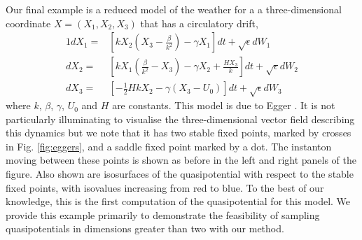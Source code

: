 Our final example is a reduced model of the weather for a a three-dimensional
coordinate $X=(X_{1},X_{2},X_{3})$ that has a circulatory drift,
\begin{alignat}{1}
dX_{1}= & \left[kX_{2}\left(X_{3}-\frac{\beta}{k^{2}}\right)-\gamma X_{1}\right]dt+\sqrt{\epsilon}dW_{1}\nonumber \\
dX_{2}= & \left[kX_{1}\left(\frac{\beta}{k^{2}}-X_{3}\right)-\gamma X_{2}+\frac{HX_{3}}{k}\right]dt+\sqrt{\epsilon}dW_{2}\nonumber \\
dX_{3}= & \left[-\tfrac{1}{2}HkX_{2}-\gamma(X_{3}-U_{0})\right]dt+\sqrt{\epsilon}dW_{3}\label{eq:egger}
\end{alignat}
where $k$, $\beta$, $\gamma$, $U_{0}$ and $H$ are constants.
This model is due to Egger \citep{egger1981stochastically}. It is
not particularly illuminating to visualise the three-dimensional vector
field describing this dynamics but we note that it has two stable
fixed points, marked by crosses in Fig. \ref{fig:eggers}, and a saddle
fixed point marked by a dot. The instanton moving between these points
is shown as before in the left and right panels of the figure. Also
shown are isosurfaces of the quasipotential with respect to the stable
fixed points, with isovalues increasing from red to blue. To the best
of our knowledge, this is the first computation of the quasipotential
for this model. We provide this example primarily to demonstrate the
feasibility of sampling quasipotentials in dimensions greater than
two with our method. 

\setlength{\tabcolsep}{2.5pt}

